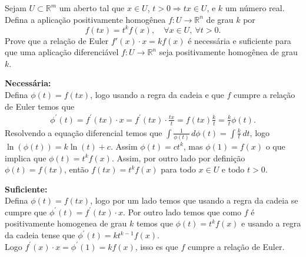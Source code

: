 \begin{homeworkProblem}[Seção 2-3]
  Sejam $U \subset \mathbb{R}^m$ um aberto tal que $x \in U$, $t > 0 \Rightarrow tx \in U$, e $k$ um número real. Defina a aplicação positivamente homogênea $f : U \to \mathbb{R}^n$ de grau $k$ por
    \[
    f(tx) = t^k f(x), \quad \forall x \in U, \ \forall t > 0.
    \]
    Prove que a relação de Euler $f'(x)\cdot x = kf(x)$ é necessária e suficiente para que uma aplicação diferenciável $f : U \to \mathbb{R}^n$ seja positivamente homogênea de grau $k$.
  \begin{solution}
    \textbf{Necessária:}\\
    Defina $\phi(t)=f(tx)$, logo usando a regra da cadeia e que $f$ cumpre a relação de Euler temos que 
    \begin{align*}
      \phi^{\prime}(t)=f^{\prime}(tx)\cdot x=f^{\prime}(tx)\cdot \frac{tx}{t}=f(tx)\frac{k}{t}=\frac{k}{t}\phi(t).
    \end{align*}
    Resolvendo a equação diferencial temos que $\displaystyle \int \frac{1}{\phi(t)}\,d\phi(t)=\int \frac{k}{t}\,dt$, logo $\displaystyle \ln(\phi(t))=k\ln(t)+c$. Assim $\phi(t)=ct^{k}$, mas $\phi(1)=f(x)$ o que implica que $\phi(t)=t^{k}f(x)$. Assim, por outro lado por definição $\phi(t)=f(tx)$, então $f(tx)=t^{k}f(x)$ para todo $x\in U$ e todo $t>0$.

    \textbf{Suficiente:}\\
    Defina $\phi(t)=f(tx)$, logo por um lado temos que usando a regra da cadeia se cumpre que $\phi^{\prime}(t)=f^{\prime}(tx)\cdot x$. Por outro lado temos que como $f$ é positivamente homogenea de grau $k$ temos que $\phi(t)=t^{k}f(x)$ e usando a regra da cadeia tense que $\phi^{\prime}(t)=kt^{k-1}f(x)$.\\
    Logo $f^{\prime}(x)\cdot x=\phi^{\prime}(1)=kf(x)$, isso es que $f$ cumpre a relação de Euler.
  \end{solution}
\end{homeworkProblem}
